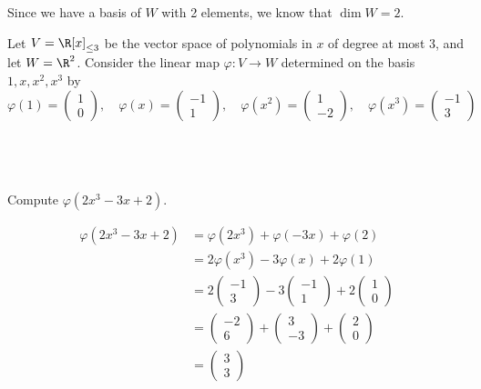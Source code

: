 \documentclass[a4paper]{article}
\begin{document}
Since we have a basis of $W$ with 2 elements, we know that $\dim W = 2$.



\begin{questionbody}
Let $V = {\R[x]}_{\le 3}$ be the vector space of polynomials in $x$ of degree at most $3$, and let $W = \R^2$. Consider the linear map $\varphi \colon V \to W$ determined on the basis $1, x, x^2, x^3$ by
\[
\varphi(1) = \begin{pmatrix}1 \\ 0\end{pmatrix},
\quad \varphi(x) = \begin{pmatrix}-1 \\ 1\end{pmatrix},
\quad \varphi(x^2) = \begin{pmatrix}1 \\ -2\end{pmatrix},
\quad \varphi(x^3) = \begin{pmatrix}-1 \\ 3\end{pmatrix}
\]
\end{questionbody}

\subsection{~} %

\begin{questionbody}
Compute $\varphi(2x^3 - 3x + 2)$.
\end{questionbody}

\begin{align*}
\varphi(2x^3 - 3x + 2) &= \varphi(2x^3) + \varphi(-3x) + \varphi(2) \\[1ex]
&= 2 \varphi(x^3) - 3 \varphi(x) + 2 \varphi(1) \\[1ex]
&= 2 \begin{pmatrix}-1 \\ 3\end{pmatrix} - 3 \begin{pmatrix}-1 \\ 1\end{pmatrix} + 2 \begin{pmatrix}1 \\ 0\end{pmatrix} \\[1ex]
&= \begin{pmatrix}-2 \\ 6\end{pmatrix} + \begin{pmatrix}3 \\ -3\end{pmatrix} + \begin{pmatrix}2 \\ 0\end{pmatrix} \\[1ex]
&= \begin{pmatrix}3 \\ 3\end{pmatrix}
\end{align*}
\end{document}
